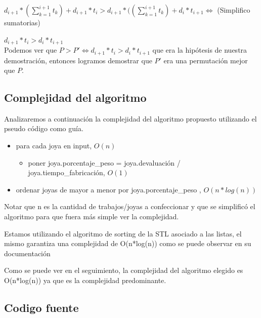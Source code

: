 $d_{i+1}*(\sum\limits_{k=1}^{i+1} t_k) + d_{i+1}*t_i > d_{i+1}*((\sum\limits_{k=1}^{i+1} t_k) + d_i*t_{i+1} \Longleftrightarrow$ (Simplifico sumatorias)

$d_{i+1}*t_i > d_i*t_{i+1}$ \\

Podemos ver que $P > P' \Longleftrightarrow d_{i+1}*t_i > d_i*t_{i+1}$ que era la hip\'otesis de nuestra demostraci\'on, entonces logramos demostrar que $P'$ era una permutaci\'on mejor que $P$.

\subsection{Complejidad del algoritmo}

Analizaremos a continuaci\'on la complejidad del algoritmo propuesto utilizando el pseudo c\'odigo como gu\'ia.

\begin{itemize}
\item para cada  joya en input, $O(n)$
\begin{itemize}
\item poner joya.porcentaje\_peso = joya.devaluaci\'on / joya.tiempo\_fabricaci\'on, $O(1)$
\end{itemize}

\item ordenar joyas de mayor a menor por joya.porcentaje\_peso , $O(n*log(n))$
\end{itemize}

Notar que n es la cantidad de trabajos/joyas a confeccionar y que se simplific\'o el algoritmo para que fuera m\'as simple ver la complejidad.

Estamos utilizando el algoritmo de sorting de la STL asociado a las listas, el mismo garantiza una complejidad de O(n*log(n)) como se puede observar en su documentaci\'on \cite{sort}

Como se puede ver en el seguimiento, la complejidad del algoritmo elegido es O(n*log(n)) ya que es la complejidad predominante.\\

\newpage
\subsection{Codigo fuente}

